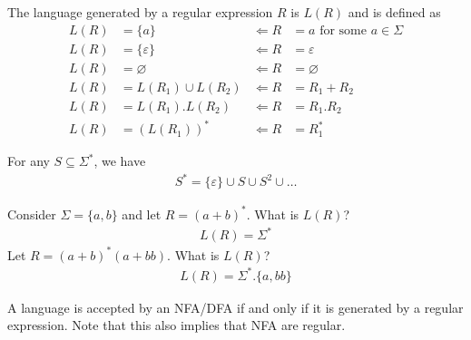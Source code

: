 \documentclass[a4paper]{article}
\theoremstyle{plain}
\newtheorem{thm}{Theorem}[section]
\theoremstyle{definition}
\newtheorem{defn}{Definition}[section]
\newtheorem{exmp}{Example}[section]
\theoremstyle{remark}
\begin{document}
\begin{tcolorbox}[colback=black!3!white,colframe=black!60!white,title=\begin{defn}Regular Expression \label{Regular Expression}\end{defn}]
The language generated by a regular expression $R$ is $L(R)$ and is defined as 
\begin{align}
	L(R) &= \{a \} &\Leftarrow R&= a \text{ for some }a\in \Sigma \\
	L(R) &= \{ \varepsilon \} &\Leftarrow R &= \varepsilon \\
	L(R) &= \varnothing &\Leftarrow R &= \varnothing \\
	L(R) &= L(R_1) \cup L(R_2) &\Leftarrow R &= R_1+R_2 \\
	L(R) &= L(R_1) . L(R_2) &\Leftarrow R &= R_1 . R_2 \\ 
	L(R) &= (L(R_1))^{*} &\Leftarrow R &= R_1^{*}
\end{align}
\end{tcolorbox}
\begin{tcolorbox}[colback=black!3!white,colframe=black!60!white,title=\begin{defn}Star \label{Star}\end{defn}]
For any $S \subseteq \Sigma^{*}$, we have
\begin{align}
S^{*} = \{ \varepsilon \} \cup S \cup S^2 \cup \ldots
\end{align}
\end{tcolorbox}
\begin{tcolorbox}[colback=black!3!white,colframe=black!60!white,title=\begin{exmp}Regular Expressions \label{Regular Expressions}\end{exmp}]
        Consider $\Sigma = \{a,b\}$ and let $R = (a+b)^{*}$. What is $L(R)$?
                \begin{align}
                L(R) = \Sigma^{*}
                \end{align}
	Let $R = (a+b)^{*}(a+bb)$. What is $L(R)$?
	\begin{align}
		L(R) = \Sigma^{*} . \{a,bb\}
	\end{align}
\end{tcolorbox}
\begin{tcolorbox}[colback=black!3!white,colframe=black!60!white,title=\begin{thm}Regularity \label{Regularity}\end{thm}]
	A language is accepted by an NFA/DFA if and only if it is generated by a regular expression. Note that this also implies that NFA are regular.
\end{tcolorbox}
\end{document}
